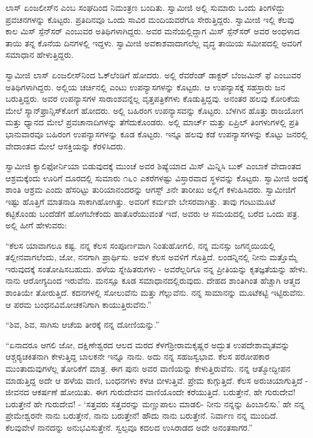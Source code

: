  ಲಾಸ್ ಏಂಜಲೀಸ್‍ನ  ಎಂಬ ಸಂಘದಿಂದ ನಿಮಂತ್ರಣ ಬಂದಿತು. ಸ್ವಾಮೀಜಿ ಅಲ್ಲಿ ಸುಮಾರು ಒಂದು ತಿಂಗಳಿದ್ದು ಪ್ರವಚನಗಳನ್ನು ಕೊಟ್ಟರು. ಪ್ರತಿದಿನವೂ ಒಂದು ಸಾವಿರ ಮಂದಿಯವರೆಗೂ ಸೇರುತ್ತಿದ್ದರು. ಸ್ವಾಮೀಜಿ ಇಲ್ಲಿ ಕೆಲವು ಕಾಲ ಮಿಸ್ ಸ್ಪೆನ್‍ಸರ್ ಎಂಬುವರ ಅತಿಥಿಗಳಾಗಿದ್ದರು. ಅವರ ಮನೆಯಲ್ಲಿದ್ದಾಗ ಮಿಸ್ ಸ್ಪೆನ್‍ಸರ್ ಅವರ ಅಂಧಳಾದ ತಾಯಿ ತನ್ನ ಕೊನೆಯ ದಿನಗಳಲ್ಲಿ ಇದ್ದಳು. ಸ್ವಾಮೀಜಿ ಅವಕಾಶವಾದಾಗಲೆಲ್ಲ ವೃದ್ಧ ತಾಯಿಯ ಸಮೀಪದಲ್ಲಿ ಅವರಿಗೆ ಸಮಾಧಾನ ಹೇಳುತ್ತಿದ್ದರು. 

 ಸ್ವಾಮೀಜಿ ಲಾಸ್ ಏಂಜಲೀಸ್‍ನಿಂದ ಓಕ್‍ಲೆಂಡಿಗೆ ಹೋದರು. ಅಲ್ಲಿ ರೆವರೆಂಡ್ ಡಾಕ್ಟರ್ ಬೆಂಜಮಿನ್ ಫೆ ಎಂಬುವರ ಅತಿಥಿಗಳಾಗಿದ್ದರು. ಅಲ್ಲಿಯ ಚರ್ಚಿನಲ್ಲಿ ಎಂಟು ಉಪನ್ಯಾಸಗಳನ್ನು ಕೊಟ್ಟರು. ಆ ಉಪನ್ಯಾಸಕ್ಕೆ ಸಹಸ್ರಾರು ಜನ ಬರುತ್ತಿದ್ದರು. ಅವರ ಉಪನ್ಯಾಸಗಳ ಸಾರಾಂಶವನ್ನೆಲ್ಲ ವೃತ್ತಪತ್ರಿಕೆಗಳು ಕೊಡುತ್ತಿದ್ದವು. ಅನಂತರ ಹಲವು ಕೋರಿಕೆಯ ಮೇಲೆ ಸ್ಯಾನ್‍ಫ್ರಾನ್ಸಿಸ್‍ಕೋಗೆ ಹೋದರು. ಅಲ್ಲಿ ಬಹಿರಂಗ ಉಪನ್ಯಾಸವನ್ನು ಕೊಟ್ಟರು. ಬೆಳಗಿನ ಹೊತ್ತು ರಾಜಯೋಗ ಮತ್ತು ಧ್ಯಾನದ ಮೇಲೆ ಪ್ರವಚಾನಾದಿಗಳನ್ನು ತೆಗೆದುಕೊಂಡರು. ಅಲ್ಲಿ ಮಾರ್ಚ್ ಮತ್ತು ಏಪ್ರಿಲ್ ತಿಂಗಳುಗಳಲ್ಲಿ ಪ್ರತಿ ಭಾನುವಾರವೂ ಬಹಿರಂಗ ಉಪನ್ಯಾಸಗಳನ್ನು ಕೂಡ ಕೊಟ್ಟರು. ಇನ್ನೂ ಹಲವು ಕಡೆ ಉಪನ್ಯಾಸಗಳನ್ನು ಕೊಟ್ಟು ಜನರಲ್ಲಿ ವೇದಾಂತದ ಮೇಲೆ ಆಸಕ್ತಿಯನ್ನು ಕೆರಳಿಸಿದರು. 

 ಸ್ವಾಮೀಜಿ ಕ್ಯಾಲಿಫೋರ್ನಿಯಾ ಬಿಡುವುದಕ್ಕೆ ಮುಂಚೆ ಅವರ ಶಿಷ್ಯೆಯಾದ ಮಿಸ್ ಮಿನ್ನಿಸಿ ಬುಕ್ ಎಂಬಾಕೆ ವೇದಾಂತದ ಆಶ್ರಮಕ್ಕೆಂದು ಊರಿಗೆ ದೂರದಲ್ಲಿ ಸುಮಾರು ೧೬೦ ಎಕರೆಗಳಷ್ಟು ವಿಸ್ತಾರವಾದ ಸ್ಥಳವನ್ನು ಕೊಟ್ಟರು. ಸ್ವಾಮೀಜಿ ಅದಕ್ಕೆ ಶಾಂತಿ ಆಶ್ರಮ ಎಂದು ಹೆಸರಿಟ್ಟು ತುರಿಯಾನಂದರನ್ನು ಆಗಸ್ಟ್ ೨ನೇ ತಾರೀಖು ಅಲ್ಲಿಗೆ ಕಳುಹಿಸಿದರು. ಸ್ವಾಮೀಜಿಗೆ ಇಷ್ಟು ಹೊತ್ತಿಗೆ ಮಾತನಾಡಿ ಸಾಕಾಗಿಹೋಗಿತ್ತು. ಅವರಿಗೆ ಕರ್ಮವೇ ಬೇಸರವಾಗಿತ್ತು. ತಾವು ಗಂಟುಮೂಟೆ ಕಟ್ಟಿಕೊಂಡು ಬಂದೆಡೆಗೆ ಹೋಗಬೇಕೆಂದು ಹಾತೊರೆಯುವಂತೆ ಇದೆ, ಅವರು ಆ ಸಮಯದಲ್ಲಿ ಬರೆದ ಒಂದು ಪತ್ರ. ಅಲ್ಲಿ ಹೀಗೆ ಹೇಳುವರು: 

 “ಕೆಲಸ ಯಾವಾಗಲೂ ಕಷ್ಟ. ನನ್ನ ಕೆಲಸ ಸಂಪೂರ್ಣವಾಗಿ ನಿಂತುಹೋಗಲಿ, ನನ್ನ ಮನಸ್ಸು ಜಗನ್ಮಯಿಯಲ್ಲಿ ತಲ್ಲೀನವಾಗಲೆಂದು, ಜೋ, ನನಗಾಗಿ ಪ್ರಾರ್ಥಿಸು. ಅವಳ ಕೆಲಸ ಅವಳಿಗೆ ಗೊತ್ತಿದೆ. ಲಂಡನ್ನಿನಲ್ಲಿ ನೀನು ಮತ್ತೊಮ್ಮೆ ಇರುವುದಕ್ಕೆ ಸಂತೋಷಿಸಬಹುದು. ಹಳೆಯ ಸ್ನೇಹಿತರುಗಳು - ಅವರೆಲ್ಲರಿಗೂ ನನ್ನ ಪ್ರೀತಿಯನ್ನು ಕೃತಜ್ಞತೆಯನ್ನು ಹೇಳು. ನಾನು ಆರೋಗ್ಯದಿಂದ ಇರುವೆನು. ಮನಸ್ಸೂ ಕೂಡ ಸಮಾಧಾನದಲ್ಲಿರುವುದು. ದೇಹದ ಶಾಂತಿಗಿಂತ ಹೆಚ್ಚಾಗಿ ಆತ್ಮದ ಶಾಂತಿಯೇ ತೋರುತ್ತಿದೆ. ಕದನಗಳಲ್ಲಿ ಸೋಲುವೆನು ಮತ್ತು ಗೆಲ್ಲುವೆನು. ನನ್ನ ಸಾಮಾನನ್ನು ಮೂಟೆಕಟ್ಟಿ ಇಟ್ಟಿರುವೆನು. ಆ ಪರಮ ಬಂಧನವಿಮೋಚಕನಿಗಾಗಿ ಕಾಯುತ್ತಿರುವೆನು.” 

 “ಶಿವ, ಶಿವ, ಸಾಗಿಸು ಆಚೆಯ ತೀರಕ್ಕೆ ನನ್ನ ದೋಣಿಯನ್ನು.” 

 “ಏನಾದರೂ ಆಗಲಿ ಜೋ, ದಕ್ಷಿಣೇಶ್ವರದ ಆಲದ ಮರದ ಕೆಳಗೆ\break ಶ‍್ರೀರಾಮಕೃಷ್ಣರ ಅದ್ಭುತ ಉಪದೇಶಾಮೃತವನ್ನು ಆಶ್ಚರ‍್ಯಚಕಿತನಾಗಿ ಕೇಳುತ್ತಿದ್ದ ಬಾಲಕನೇ ಇನ್ನೂ ನಾನು. ಅದು ನನ್ನ ಸಹಜಸ್ವಭಾವ. ಕೆಲಸ ಪರೋಪಕಾರ ಮುಂತಾದುವುಗಳೆಲ್ಲ ತೋರಿಕೆಗೆ ಮಾತ್ರ. ಈಗ ಪುನಃ ಅವರ ವಾಣಿಯನ್ನು ಕೇಳುತ್ತಿರುವೆನು. ನನ್ನ ಆತ್ಮೋದ್ದೀಪನ ಮಾಡುತ್ತಿದ್ದ ಅದೇ ಆ ಹಳೆಯ ವಾಣಿ, ಬಂಧನಗಳು ಕಳಚಿ ಬೀಳುತ್ತಿವೆ. ಪ್ರೇಮ ಕುಗ್ಗುತ್ತಿದೆ. ಕೆಲಸ ಅರುಚಿಯಾಗುತ್ತಿದೆ - ಜೀವನದ ಆಕರ್ಷಣೆ ಹೋಯಿತು. ಈಗ ಗುರುದೇವನ ವಾಣಿಯೊಂದೇ ಕರೆಯುತ್ತಿದೆ. ಬರುತ್ತೇನೆ, ಹೇ ಗುರುದೇವ! ಬರುತ್ತೇನೆ ಹೇ ಗುರುದೇವ! - ‘ಸತ್ತವರು ಸತ್ತವರನ್ನು ಮಣ್ಣುಪಾಲು ಮಾಡಲಿ- ನೀನು ನನ್ನನ್ನು ಹಿಂಬಾಲಿಸು.’ ಹೇ ನನ್ನ ಪ್ರೇಮೇಶ್ವರನೇ ನಾನು ಬರುತ್ತೇನೆ, ನಾನು ಬರುತ್ತೇನೆ! ಹೌದು ನಾನು ಬರುತ್ತೇನೆ. ನಿರ್ವಾಣ ನನ್ನ ಮುಂದಿದೆ. ಕೆಲವುವೇಳೆ ನಾನದನ್ನು ಅನುಭವಿಸುತ್ತೇನೆ. ಸ್ವಲ್ಪವೂ ಕದಲದ ಉಸಿರಾಡದ ಅದೇ ಅನಂತಸಾಗರ.” 

